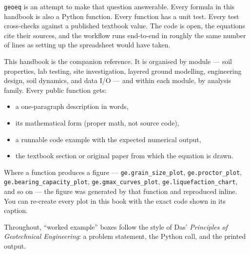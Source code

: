 \documentclass[11pt,a4paper,openany]{book}
\newcommand{\geo}{\texttt{geoeq}}
\begin{document}
\geo{} is an attempt to make that question answerable. Every
formula in this handbook is also a Python function. Every
function has a unit test. Every test cross-checks against a
published textbook value. The code is open, the equations cite
their sources, and the workflow runs end-to-end in roughly the
same number of lines as setting up the spreadsheet would have
taken.

This handbook is the companion reference. It is organised by
module --- soil properties, lab testing, site investigation,
layered ground modelling, engineering design, soil dynamics,
and data I/O --- and within each module, by analysis family.
Every public function gets:

\begin{itemize}[leftmargin=*]
\item a one-paragraph description in words,
\item its mathematical form (proper math, not source code),
\item a runnable code example with the expected numerical
      output,
\item the textbook section or original paper from which the
      equation is drawn.
\end{itemize}

Where a function produces a figure --- \texttt{ge.grain\_size\_plot},
\texttt{ge.proctor\_plot}, \texttt{ge.bearing\_capacity\_plot},
\texttt{ge.gmax\_curves\_plot}, \texttt{ge.liquefaction\_chart}, and
so on --- the figure was generated by that function and reproduced
inline. You can re-create every plot in this book with the exact
code shown in its caption.

Throughout, ``worked example'' boxes follow the style of Das'
\emph{Principles of Geotechnical Engineering}: a problem statement,
the Python call, and the printed output.
\end{document}
